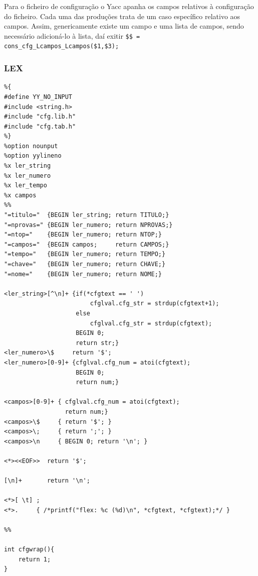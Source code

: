 \documentclass[11pt, a4paper, oneside]{article}
\begin{document}
Para o ficheiro de configuração o Yacc apanha os campos relativos à configuração do ficheiro. Cada uma das produções trata de um caso específico relativo aos campos. Assim, genericamente existe um campo e uma lista de campos, sendo necessário adicioná-lo à lista, daí exitir \texttt{\$\$ = cons\_cfg\_Lcampos\_Lcampos(\$1,\$3); }
\newpage
\subsubsection{LEX}
\begin{lstlisting} 
%{
#define YY_NO_INPUT
#include <string.h>
#include "cfg.lib.h"
#include "cfg.tab.h"
%}
%option nounput
%option yylineno
%x ler_string
%x ler_numero
%x ler_tempo
%x campos
%%
"=titulo="  {BEGIN ler_string; return TITULO;}
"=nprovas=" {BEGIN ler_numero; return NPROVAS;}
"=ntop="    {BEGIN ler_numero; return NTOP;}
"=campos="  {BEGIN campos;     return CAMPOS;}
"=tempo="   {BEGIN ler_numero; return TEMPO;}
"=chave="   {BEGIN ler_numero; return CHAVE;}
"=nome="    {BEGIN ler_numero; return NOME;}

<ler_string>[^\n]+ {if(*cfgtext == ' ')
                        cfglval.cfg_str = strdup(cfgtext+1);
                    else
                        cfglval.cfg_str = strdup(cfgtext);
                    BEGIN 0;
                    return str;}
<ler_numero>\$     return '$';
<ler_numero>[0-9]+ {cfglval.cfg_num = atoi(cfgtext);
                    BEGIN 0;
                    return num;}

<campos>[0-9]+ { cfglval.cfg_num = atoi(cfgtext);
                 return num;}
<campos>\$     { return '$'; }
<campos>\;     { return ';'; }
<campos>\n     { BEGIN 0; return '\n'; }

<*><<EOF>>  return '$';

[\n]+       return '\n';

<*>[ \t] ;
<*>.     { /*printf("flex: %c (%d)\n", *cfgtext, *cfgtext);*/ }

%%

int cfgwrap(){
    return 1;
}
\end{lstlisting} 
\newpage


\end{document}
